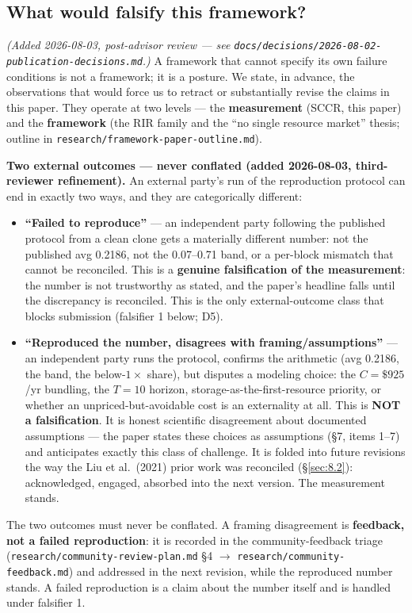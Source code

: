 \documentclass[11pt]{article}
\begin{document}
\subsection{What would falsify this framework?}\label{sec:7.1}
\textit{(Added 2026-08-03, post-advisor review --- see
\texttt{docs/decisions/2026-08-02-publication-decisions.md}.)} A framework that
cannot specify its own failure conditions is not a framework; it is a posture. We
state, in advance, the observations that would force us to retract or
substantially revise the claims in this paper. They operate at two levels --- the
\textbf{measurement} (SCCR, this paper) and the \textbf{framework} (the RIR
family and the ``no single resource market'' thesis; outline in
\texttt{research/framework-paper-outline.md}).

\textbf{Two external outcomes --- never conflated (added 2026-08-03,
third-reviewer refinement).} An external party's run of the reproduction
protocol can end in exactly two ways, and they are categorically different:
\begin{itemize}[nosep]
  \item \textbf{``Failed to reproduce''} --- an independent party following the
  published protocol from a clean clone gets a materially different number: not
  the published avg 0.2186, not the 0.07--0.71 band, or a per-block mismatch
  that cannot be reconciled. This is a \textbf{genuine falsification of the
  measurement}: the number is not trustworthy as stated, and the paper's
  headline falls until the discrepancy is reconciled. This is the only
  external-outcome class that blocks submission (falsifier 1 below; D5).
  \item \textbf{``Reproduced the number, disagrees with
  framing/assumptions''} --- an independent party runs the protocol, confirms
  the arithmetic (avg 0.2186, the band, the below-$1\times$ share), but
  disputes a modeling choice: the $C = \$925$/yr bundling, the $T=10$ horizon,
  storage-as-the-first-resource priority, or whether an unpriced-but-avoidable
  cost is an externality at all. This is \textbf{NOT a falsification}. It is
  honest scientific disagreement about documented assumptions --- the paper
  states these choices as assumptions (\S7, items 1--7) and anticipates exactly
  this class of challenge. It is folded into future revisions the way the Liu
  et al.\ (2021) prior work was reconciled (\S\ref{sec:8.2}): acknowledged,
  engaged, absorbed into the next version. The measurement stands.
\end{itemize}
The two outcomes must never be conflated. A framing disagreement is
\textbf{feedback, not a failed reproduction}: it is recorded in the
community-feedback triage (\texttt{research/community-review-plan.md} \S4
$\rightarrow$ \texttt{research/community-feedback.md}) and addressed in the
next revision, while the reproduced number stands. A failed reproduction is a
claim about the number itself and is handled under falsifier 1.
\end{document}
